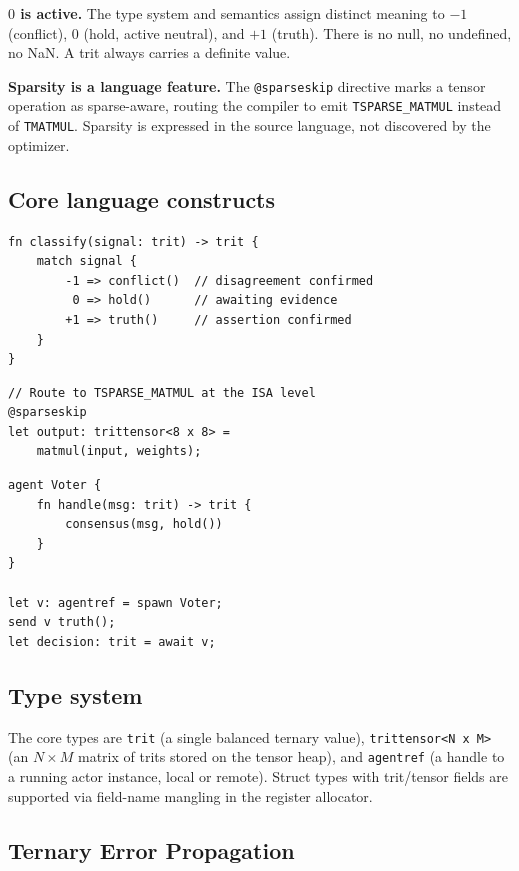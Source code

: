 \documentclass[journal,10pt,twocolumn]{IEEEtran}
\begin{document}
\textbf{$0$ is active.} The type system and semantics assign distinct meaning
to $-1$ (conflict), $0$ (hold, active neutral), and $+1$ (truth). There is no
null, no undefined, no NaN. A trit always carries a definite value.

\textbf{Sparsity is a language feature.} The \texttt{@sparseskip} directive
marks a tensor operation as sparse-aware, routing the compiler to emit
\texttt{TSPARSE\_MATMUL} instead of \texttt{TMATMUL}. Sparsity is expressed
in the source language, not discovered by the optimizer.

\subsection{Core language constructs}

\begin{lstlisting}[caption={Ternary classifier with exhaustive match}]
fn classify(signal: trit) -> trit {
    match signal {
        -1 => conflict()  // disagreement confirmed
         0 => hold()      // awaiting evidence
        +1 => truth()     // assertion confirmed
    }
}
\end{lstlisting}

\begin{lstlisting}[caption={Sparse matrix multiply with @sparseskip}]
// Route to TSPARSE_MATMUL at the ISA level
@sparseskip
let output: trittensor<8 x 8> =
    matmul(input, weights);
\end{lstlisting}

\begin{lstlisting}[caption={Actor model for ternary message passing}]
agent Voter {
    fn handle(msg: trit) -> trit {
        consensus(msg, hold())
    }
}

let v: agentref = spawn Voter;
send v truth();
let decision: trit = await v;
\end{lstlisting}

\subsection{Type system}

The core types are \texttt{trit} (a single balanced ternary value),
\texttt{trittensor<N x M>} (an $N \times M$ matrix of trits stored on the
tensor heap), and \texttt{agentref} (a handle to a running actor instance,
local or remote). Struct types with trit/tensor fields are supported via
field-name mangling in the register allocator.

\subsection{Ternary Error Propagation}
\label{subsec:propagate}
\end{document}
